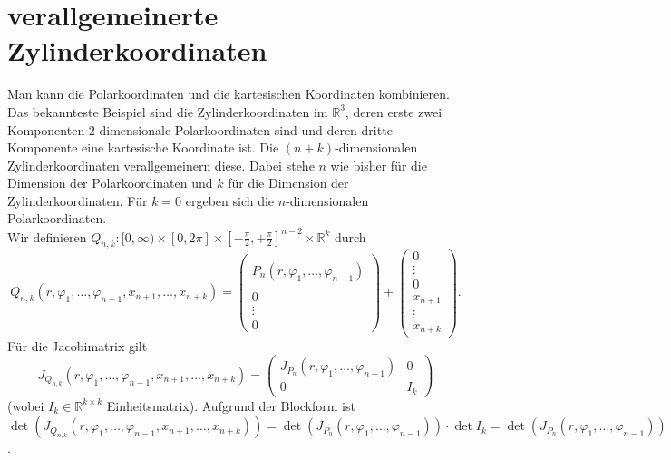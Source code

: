 \documentclass[a4paper,11pt]{report}
\theoremstyle{definition}
\newcommand{\R}{{\ensuremath{\mathbb{R}}}}
\begin{document}
\section{verallgemeinerte Zylinderkoordinaten}
Man kann die Polarkoordinaten und die kartesischen Koordinaten kombinieren. Das bekannteste Beispiel sind die Zylinderkoordinaten im $\R^3$, deren erste zwei Komponenten 2-dimensionale Polarkoordinaten sind und deren dritte Komponente eine kartesische Koordinate ist. Die $(n+k)$-dimensionalen Zylinderkoordinaten verallgemeinern diese. Dabei stehe $n$ wie bisher für die Dimension der Polarkoordinaten und $k$ für die Dimension der Zylinderkoordinaten. Für $k=0$ ergeben sich die $n$-dimensionalen Polarkoordinaten.\\
Wir definieren $Q_{n,k}:[0,\infty)\times[0, 2\pi]\times[-\frac{\pi}{2},+\frac{\pi}{2}]^{n-2}\times \R^k$ durch
$$Q_{n,k}(r,\varphi_1,\ldots,\varphi_{n-1}, x_{n+1}, \ldots, x_{n+k})=
\begin{pmatrix} \\ P_n(r,\varphi_1,\ldots,\varphi_{n-1}) \\ \\ 0 \\ \vdots \\ 0 \end{pmatrix}
+ \begin{pmatrix} 0 \\ \vdots \\ 0 \\ x_{n+1} \\ \vdots \\ x_{n+k} \end{pmatrix}.$$
Für die Jacobimatrix gilt $$J_{Q_{n,k}}(r,\varphi_1,\ldots,\varphi_{n-1}, x_{n+1}, \ldots, x_{n+k})=\begin{pmatrix}
J_{P_n}(r,\varphi_1,\ldots,\varphi_{n-1}) & 0 \\ 0 & I_k
\end{pmatrix}$$
(wobei $I_k\in\R^{k\times k}$ Einheitsmatrix). Aufgrund der Blockform ist $\det (J_{Q_{n,k}}(r,\varphi_1,\ldots,\varphi_{n-1}, x_{n+1}, \ldots, x_{n+k})) = \det (J_{P_n}(r,\varphi_1,\ldots,\varphi_{n-1}))\cdot \det I_k=\det (J_{P_n}(r,\varphi_1,\ldots,\varphi_{n-1}))$.
\end{document}
